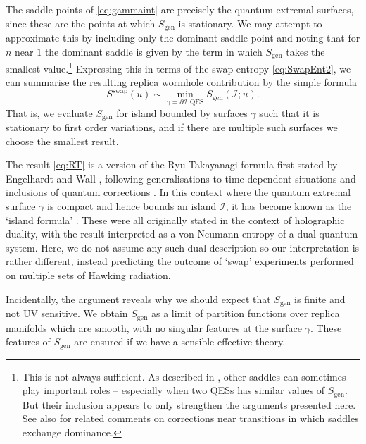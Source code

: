 \documentclass[letterpaper,12pt]{article}
\newcommand*{\island}{\mathcal{I}}
\begin{document}
The saddle-points of \eqref{eq:gammaint} are precisely the quantum extremal surfaces, since these are the points at which $S_\mathrm{gen}$ is stationary. We may attempt to approximate this by including only the dominant saddle-point and noting that for $n$ near $1$ the dominant saddle is given by the term in which $S_\mathrm{gen}$ takes the smallest value.\footnote{This is not always sufficient.  As described in \cite{Penington:2019kki,Dong:2020iod,Akers:2020pmf}, other saddles can sometimes play important roles --  especially when two QESs has similar values of $S_\mathrm{gen}$. But their inclusion appears to only strengthen the arguments presented here. See also
\cite{Vidmar:2017pak,Murthy:2019qvb,MarolfWangWang2020} for related comments on corrections near transitions in which saddles exchange dominance.\label{foot:transitions}}
Expressing this in terms of the swap entropy \eqref{eq:SwapEnt2}, we can summarise the resulting replica wormhole contribution by the simple formula
\begin{equation}\label{eq:RT}
	S^{\text{swap}}(u) \sim \min_{\gamma=\partial\island \text{ QES}} S_\mathrm{gen}(\island;u).
\end{equation}
That is, we evaluate $S_\mathrm{gen}$ for island bounded by surfaces $\gamma$ such that it is stationary to first order variations, and if there are multiple such surfaces we choose the smallest result.

The result \eqref{eq:RT} is a version of the Ryu-Takayanagi formula \cite{Ryu:2006bv,Ryu:2006ef} first stated by Engelhardt and Wall \cite{Engelhardt:2014gca}, following generalisations to time-dependent situations \cite{Hubeny:2007xt} and inclusions of quantum corrections \cite{Faulkner:2013ana}. In this context where the quantum extremal surface $\gamma$ is compact and hence bounds an island $\island$, it has become known as the `island formula' \cite{Almheiri:2019hni}. These were all originally stated in the context of holographic duality, with the result interpreted as a von Neumann entropy of a dual quantum system. Here, we do not assume any such dual description so our interpretation is rather different, instead predicting the outcome of `swap' experiments performed on multiple sets of Hawking radiation.

Incidentally, the argument reveals why we should expect that $S_\mathrm{gen}$ is finite and not UV sensitive. We obtain $S_\mathrm{gen}$ as a limit of partition functions over replica manifolds which are smooth, with no singular features at the surface $\gamma$. These features of $S_\mathrm{gen}$ are ensured if we have a sensible effective theory.
\end{document}
